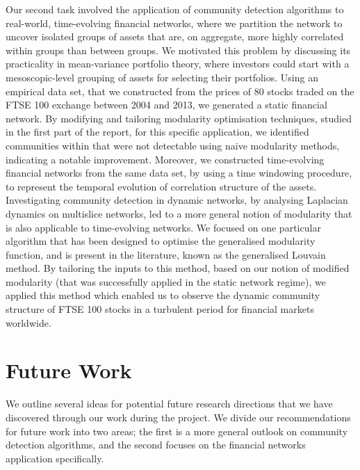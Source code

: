 Our second task involved the application of community detection algorithms to real-world, time-evolving financial networks, where we partition the network to uncover isolated groups of assets that are, on aggregate, more highly correlated within groups than between groups.
We motivated this problem by discussing its practicality in mean-variance portfolio theory, where investors could start with a mesoscopic-level grouping of assets for selecting their portfolios.
Using an empirical data set, that we constructed from the prices of 80 stocks traded on the FTSE 100 exchange between 2004 and 2013, we generated a static financial network.
By modifying and tailoring modularity optimisation techniques, studied in the first part of the report, for this specific application, we identified communities within that were not detectable using naive modularity methods, indicating a notable improvement.
Moreover, we constructed time-evolving financial networks from the same data set, by using a time windowing procedure, to represent the temporal evolution of correlation structure of the assets. 
Investigating community detection in dynamic networks, by analysing Laplacian dynamics on multislice networks, led to a more general notion of modularity that is also applicable to time-evolving networks.
We focused on one particular algorithm that has been designed to optimise the generalised modularity function, and is present in the literature, known as the generalised Louvain method.
By tailoring the inputs to this method, based on our notion of modified modularity (that was successfully applied in the static network regime), we applied this method which enabled us to observe the dynamic community structure of FTSE 100 stocks in a turbulent period for financial markets worldwide.


\section{Future Work}
\label{sec:futureWork}

We outline several ideas for potential future research directions that we have discovered through our work during the project.
We divide our recommendations for future work into two areas; the first is a more general outlook on community detection algorithms, and the second focuses on the financial networks application specifically.

